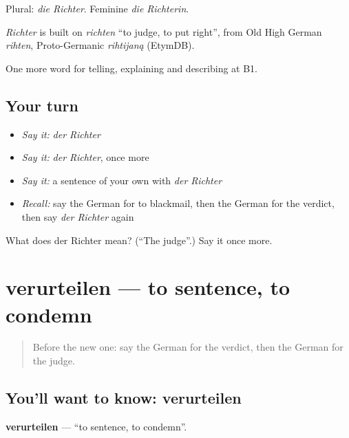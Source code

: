 Plural: \emph{die Richter}. Feminine \emph{die Richterin}.

\begin{cousinweb}
\emph{Richter} is built on \emph{richten} \textquotedblleft{}to judge, to put right\textquotedblright{}, from Old High German \emph{rihten}, Proto-Germanic \emph{rihtijaną} (EtymDB).
\end{cousinweb}

\begin{grammarlens}[title={What you've built}]
One more word for telling, explaining and describing at B1.
\end{grammarlens}

\subsection*{Your turn}
\begin{itemize}
\raggedright
  \item \emph{Say it:} \emph{der Richter}
  \item \emph{Say it:} \emph{der Richter}, once more
  \item \emph{Say it:} a sentence of your own with \emph{der Richter}
  \item \emph{Recall:} say the German for to blackmail, then the German for the verdict, then say \emph{der Richter} again
\end{itemize}

\begin{tcolorbox}[breakable,colback=teal!4,colframe=teal!35!black,title={Before you move on}]
What does der Richter mean? (\textquotedblleft{}The judge\textquotedblright{}.) Say it once more.
\end{tcolorbox}
\section[verurteilen]{verurteilen — to sentence, to condemn}

\label{lesson:GE-C286-verurteilen}



\begin{quote}
Before the new one: say the German for the verdict, then the German for the judge.
\end{quote}

\subsection*{You'll want to know: verurteilen}
\textbf{verurteilen} — \textquotedblleft{}to sentence, to condemn\textquotedblright{}.

